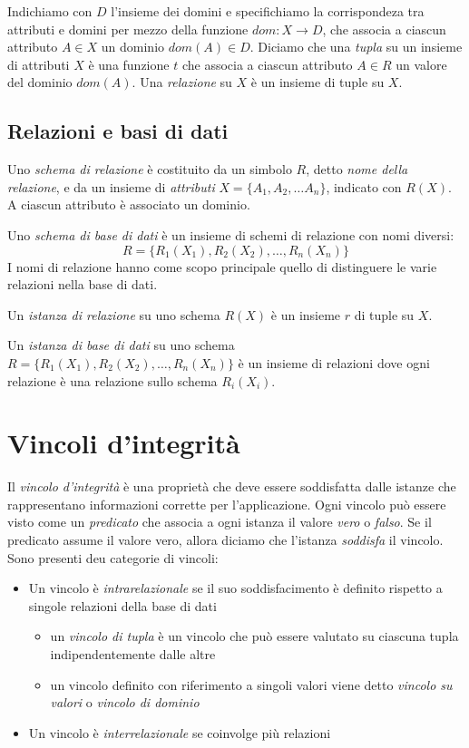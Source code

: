 \documentclass[11pt]{book}
\begin{document}
Indichiamo con $D$ l'insieme dei domini e specifichiamo la corrispondeza tra attributi e domini per mezzo della funzione 
$dom:X\rightarrow D$, che associa a ciascun attributo $A\in X$ un dominio $dom(A)\in D$. Diciamo che una \textit{tupla} 
su un insieme di attributi $X$ è una funzione $t$ che associa a ciascun attributo $A\in R$ un valore del dominio $dom(A)$.
Una \textit{relazione} su $X$ è un insieme di tuple su $X$.
\subsection{Relazioni e basi di dati}
Uno \textit{schema di relazione} è costituito da un simbolo $R$, detto \textit{nome della relazione}, e da un insieme di 
\textit{attributi} $X=\{A_1,A_2,\dots A_n\}$, indicato con $R(X)$. A ciascun attributo è associato un dominio.

Uno \textit{schema di base di dati} è un insieme di schemi di relazione con nomi diversi:
\begin{equation*}
    R=\{R_1(X_1),R_2(X_2),\dots,R_n(X_n)\}
\end{equation*}
I nomi di relazione hanno come scopo principale quello di distinguere le varie relazioni nella base di dati.

Un \textit{istanza di relazione} su uno schema $R(X)$ è un insieme $r$ di tuple su $X$.

Un \textit{istanza di base di dati} su uno schema $R=\{R_1(X_1),R_2(X_2),\dots,R_n(X_n)\}$ è un insieme di relazioni dove 
ogni relazione è una relazione sullo schema $R_i(X_i)$.
\section{Vincoli d'integrità}
Il \textit{vincolo d'integrità} è una proprietà che deve essere soddisfatta dalle istanze che rappresentano informazioni 
corrette per l'applicazione. Ogni vincolo può essere visto come un \textit{predicato} che associa a ogni istanza il valore 
\textit{vero} o \textit{falso}. Se il predicato assume il valore vero, allora diciamo che l'istanza \textit{soddisfa} il 
vincolo. Sono presenti deu categorie di vincoli:
\begin{itemize}
    \item Un vincolo è \textit{intrarelazionale} se il suo soddisfacimento è definito rispetto a singole relazioni della 
    base di dati 
    \begin{itemize}
        \item un \textit{vincolo di tupla} è un vincolo che può essere valutato su ciascuna tupla indipendentemente dalle 
        altre
        \item un vincolo definito con riferimento a singoli valori viene detto \textit{vincolo su valori} o \textit{vincolo 
        di dominio}
    \end{itemize}
    \item Un vincolo è \textit{interrelazionale} se coinvolge più relazioni
\end{itemize}
\end{document}
